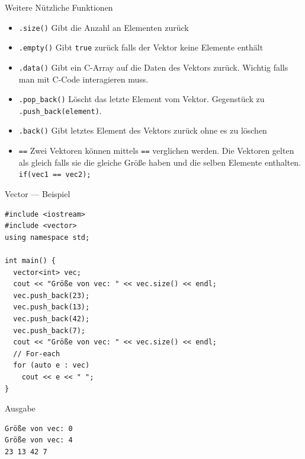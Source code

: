 \documentclass[presentation]{beamer}
\begin{document}
\begin{frame}[fragile,label={sec:org51bc006}]{Weitere Nützliche Funktionen}
 \begin{itemize}
\item {\color{solarizedYellow}\texttt{.size()} }Gibt die Anzahl an Elementen zurück
\item {\color{solarizedYellow}\texttt{.empty()} }Gibt {\color{solarizedYellow}\texttt{true} }zurück falls der Vektor keine Elemente enthält
\item {\color{solarizedYellow}\texttt{.data()} }Gibt ein C-Array auf die Daten des Vektors zurück. Wichtig
falls man mit C-Code interagieren muss.
\item {\color{solarizedYellow}\texttt{.pop\_back()} }Löscht das letzte Element vom Vektor. Gegenstück zu
{\color{solarizedYellow}\texttt{.push\_back(element)}}.
\item {\color{solarizedYellow}\texttt{.back()} }Gibt letztes Element des Vektors zurück ohne es zu löschen
\item {\color{solarizedYellow}\texttt{==} }Zwei Vektoren können mittels {\color{solarizedYellow}\texttt{==} }verglichen werden. Die
Vektoren gelten als gleich falls sie die gleiche Größe haben und die
selben Elemente enthalten. {\color{solarizedYellow}\texttt{if(vec1 == vec2);}}
\end{itemize}
\end{frame}
\begin{frame}[fragile,label={sec:org0284bd0}]{Vector --- Beispiel}
 \begin{verbatim}
#include <iostream>
#include <vector>
using namespace std;

int main() {
  vector<int> vec;
  cout << "Größe von vec: " << vec.size() << endl;
  vec.push_back(23);
  vec.push_back(13);
  vec.push_back(42);
  vec.push_back(7);
  cout << "Größe von vec: " << vec.size() << endl;
  // For-each 
  for (auto e : vec)
    cout << e << " ";
}
\end{verbatim}
\begin{block}{Ausgabe}
\begin{verbatim}
Größe von vec: 0
Größe von vec: 4
23 13 42 7 
\end{verbatim}
\end{block}
\end{frame}
\end{document}
